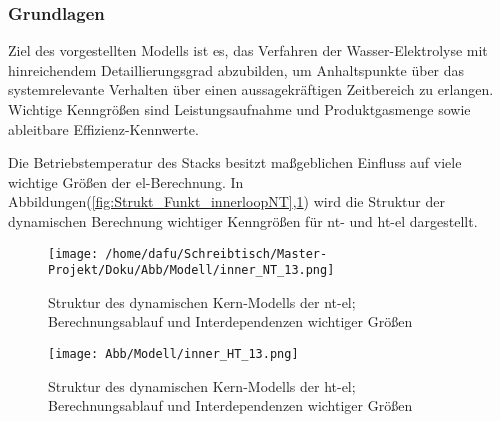 \documentclass[onecolumn,10pt,titlepage]{article}
\begin{document}
\subsubsection{Grundlagen}
Ziel des vorgestellten Modells ist es, das Verfahren der Wasser-Elektrolyse mit hinreichendem Detaillierungsgrad abzubilden, um Anhaltspunkte über das systemrelevante Verhalten über einen aussagekräftigen Zeitbereich zu erlangen.\\ Wichtige Kenngrößen sind Leistungsaufnahme und Produktgasmenge sowie ableitbare Effizienz-Kennwerte.

Die Betriebstemperatur des Stacks besitzt maßgeblichen Einfluss auf viele wichtige Größen der \gls{el}-Berechnung.
In Abbildungen(\ref{fig:Strukt_Funkt_innerloopNT},\ref{fig:Strukt_Funkt_innerloopHT}) wird die Struktur der dynamischen Berechnung wichtiger Kenngrößen für \gls{nt}- und \gls{ht}-\gls{el} dargestellt.\\

%

\begin{figure}[!tbp]
	\centering
	\begin{minipage}[t]{0.49\textwidth}
		\texttt{[image: /home/dafu/Schreibtisch/Master-Projekt/Doku/Abb/Modell/inner\_NT\_13.png]}

		\caption[Kern-Modell \gls{ht}-\gls{el}]{Struktur des dynamischen Kern-Modells der \gls{nt}-\gls{el}; Berechnungsablauf und Interdependenzen wichtiger Größen}
		\label{fig:Strukt_Funkt_innerloopNT}
	\end{minipage}
	\hfill
	\begin{minipage}[t]{0.49\textwidth}
		\texttt{[image: Abb/Modell/inner\_HT\_13.png]}

		\caption[Kern-Modell \gls{ht}-\gls{el}]{Struktur des dynamischen Kern-Modells der \gls{ht}-\gls{el}; Berechnungsablauf und Interdependenzen wichtiger Größen}
		\label{fig:Strukt_Funkt_innerloopHT}
	\end{minipage}
\end{figure}
\end{document}

